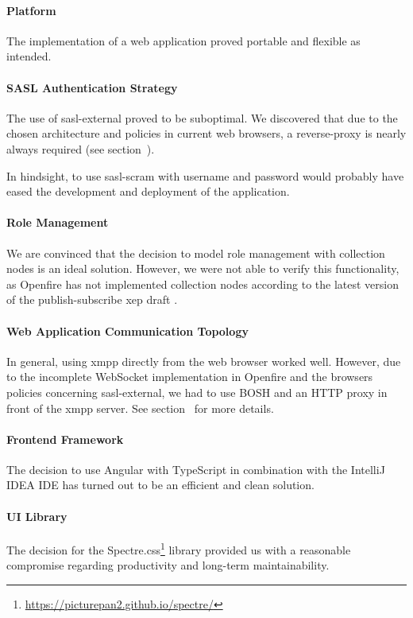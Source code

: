 \paragraph{Platform}
The implementation of a web application proved portable and flexible as intended.

\paragraph{SASL Authentication Strategy}
The use of \gls{sasl-external} proved to be suboptimal.
We discovered that due to the chosen architecture and policies in current web browsers, a reverse-proxy is nearly always required (see section~).

In hindsight, to use \gls{sasl-scram} with username and password would probably have eased the development and deployment of the application.

\paragraph{Role Management}
We are convinced that the decision to model role management with collection nodes is an ideal solution.
However, we were not able to verify this functionality, as Openfire has not implemented collection nodes according to the latest version of the \gls{publish-subscribe} \gls{xep} draft \cite{xep-0248}.

\paragraph{Web Application Communication Topology}
In general, using \gls{xmpp} directly from the web browser worked well.
However, due to the incomplete WebSocket implementation in Openfire and the browsers policies concerning \gls{sasl-external}, we had to use BOSH and an HTTP proxy in front of the \gls{xmpp} server.
See section~ for more details.

\paragraph{Frontend Framework}
The decision to use Angular with TypeScript in combination with the IntelliJ IDEA IDE has turned out to be an efficient and clean solution.

\paragraph{UI Library}
The decision for the Spectre.css\footnote{\url{https://picturepan2.github.io/spectre/}} library provided us with a reasonable compromise regarding productivity and long-term maintainability.

